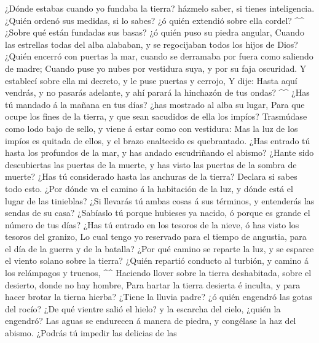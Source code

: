  ¿Dónde estabas cuando yo fundaba la tierra? házmelo saber,
si tienes inteligencia.  ¿Quién ordenó sus medidas, si lo
sabes? ¿ó quién extendió sobre ella cordel? \^{}\^{}  ¿Sobre
qué están fundadas sus basas? ¿ó quién puso su piedra angular,
 Cuando las estrellas todas del alba alababan, y se
regocijaban todos los hijos de Dios?  ¿Quién encerró con
puertas la mar, cuando se derramaba por fuera como saliendo de madre;
 Cuando puse yo nubes por vestidura suya, y por su faja
oscuridad.  Y establecí sobre ella mi decreto, y le puse
puertas y cerrojo,  Y dije: Hasta aquí vendrás, y no
pasarás adelante, y ahí parará la hinchazón de tus ondas? \^{}\^{}
 ¿Has tú mandado á la mañana en tus días? ¿has mostrado al
alba su lugar,  Para que ocupe los fines de la tierra, y
que sean sacudidos de ella los impíos?  Trasmúdase como
lodo bajo de sello, y viene á estar como con vestidura: 
Mas la luz de los impíos es quitada de ellos, y el brazo enaltecido es
quebrantado.  ¿Has entrado tú hasta los profundos de la
mar, y has andado escudriñando el abismo?  ¿Hante sido
descubiertas las puertas de la muerte, y has visto las puertas de la
sombra de muerte?  ¿Has tú considerado hasta las anchuras
de la tierra? Declara si sabes todo esto.  ¿Por dónde va el
camino á la habitación de la luz, y dónde está el lugar de las
tinieblas?  ¿Si llevarás tú ambas cosas á sus términos, y
entenderás las sendas de su casa?  ¿Sabíaslo tú porque
hubieses ya nacido, ó porque es grande el número de tus días?
 ¿Has tú entrado en los tesoros de la nieve, ó has visto
los tesoros del granizo,  Lo cual tengo yo reservado para
el tiempo de angustia, para el día de la guerra y de la batalla?
 ¿Por qué camino se reparte la luz, y se esparce el viento
solano sobre la tierra?  ¿Quién repartió conducto al
turbión, y camino á los relámpagos y truenos, \^{}\^{} 
Haciendo llover sobre la tierra deshabitada, sobre el desierto, donde no
hay hombre,  Para hartar la tierra desierta é inculta, y
para hacer brotar la tierna hierba?  ¿Tiene la lluvia
padre? ¿ó quién engendró las gotas del rocío?  ¿De qué
vientre salió el hielo? y la escarcha del cielo, ¿quién la engendró?
 Las aguas se endurecen á manera de piedra, y congélase la
haz del abismo.  ¿Podrás tú impedir las delicias de las
